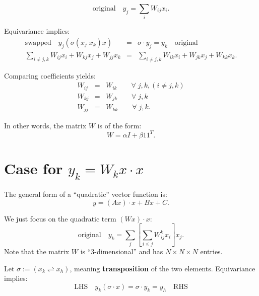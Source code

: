 \begin{equation}
\boxed{\mbox{original}} \quad y_j = \sum_i W_{ij} x_i .
\end{equation}

Equivariance implies:
\begin{eqnarray}
\boxed{\mbox{swapped}} \quad y_j ( \sigma(x_j \; x_k) x) &=& \sigma \cdot y_j = y_k \quad \boxed{\mbox{original}} \\
\sum_{i \neq j,k} W_{ij} x_i + W_{kj} x_j + W_{jj} x_k &=& \sum_{i \neq j,k} W_{ik} x_i + W_{jk} x_j + W_{kk} x_k . \nonumber
\end{eqnarray}


Comparing coefficients yields:
\begin{eqnarray}
W_{ij} &=& W_{ik} \quad \quad \forall \; j, k, (i \neq j, k) \nonumber \\
W_{kj} &=& W_{jk} \quad \quad \forall \; j, k \nonumber \\
W_{jj} &=& W_{kk} \quad \quad \forall \; j, k .
\end{eqnarray}

In other words, the matrix $W$ is of the form:
\begin{equation}
W = \alpha I + \beta 1 1^T .
\end{equation}

\section{Case for $y_k = W_k x \cdot x$}

The general form of a ``quadratic'' vector function is:
\begin{equation}
y = (A x) \cdot x + B x + C .
\end{equation}

We just focus on the quadratic term $(W x) \cdot x$:
\begin{equation}
\boxed{\mbox{original}} \quad y_k = \sum_j \left[ \sum_{i \le j} W_{ij}^k x_i \right] x_j .
\end{equation}
Note that the matrix $W$ is ``3-dimensional'' and has $N \times N \times N$ entries.

Let $\sigma := (x_k \rightleftharpoons x_h)$, meaning \textbf{transposition} of the two elements.  Equivariance implies:
\begin{equation}
\boxed{\mbox{LHS}} \quad y_k ( \sigma \cdot x) = \sigma \cdot y_k = y_h \quad \boxed{\mbox{RHS}}
\end{equation}

